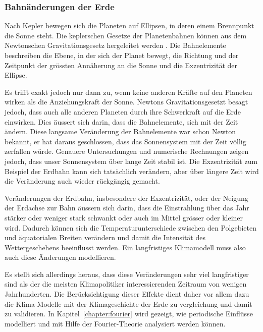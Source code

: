 \subsubsection{Bahnänderungen der Erde}
%
Nach Kepler bewegen sich die Planeten auf Ellipsen,
in deren einem Brennpunkt die Sonne steht.
Die keplerschen Gesetze der Planetenbahnen können aus dem Newtonschen 
Gravitationsgesetz hergeleitet werden
\cite[\S 6]{skript:joos}.
%
Die Bahnelemente beschreiben die Ebene, in der sich der Planet bewegt,
die Richtung und der Zeitpunkt der grössten Annäherung an die Sonne und
die Exzentrizität der Ellipse.
%

Es trifft exakt jedoch nur dann zu, wenn keine anderen Kräfte auf den
Planeten wirken als die Anziehungskraft der Sonne.
Newtons Gravitationsgesetzt besagt jedoch, dass auch alle anderen
Planeten durch ihre Schwerkraft auf die Erde einwirken.
Dies äussert sich darin, dass die Bahnelemente, sich mit der Zeit
ändern.
Diese langsame Veränderung der Bahnelemente war schon Newton bekannt,
er hat daraus geschlossen, dass das Sonnensystem mit der Zeit völlig
zerfallen würde.
Genauere Untersuchungen und numerische Rechnungen zeigen jedoch, dass
unser Sonnensystem über lange Zeit stabil ist.
Die Exzentrizität zum Beispiel der Erdbahn kann sich tatsächlich verändern,
aber über längere Zeit wird die Veränderung auch wieder rückgängig
gemacht.

Veränderungen der Erdbahn, insbesondere der Exzentrizität, oder der
Neigung der Erdachse zur Bahn äussern sich darin, dass die Einstrahlung
über das Jahr stärker oder weniger stark schwankt oder auch im Mittel
grösser oder kleiner wird.
%
Dadurch können sich die Temperaturunterschiede zwischen den Polgebieten und
äquatorialen Breiten verändern und damit die Intensität des Wettergeschehens
beeinflusst werden.
Ein langfristiges Klimamodell muss also auch diese Änderungen
modellieren.

Es stellt sich allerdings heraus, dass diese Veränderungen sehr viel
langfristiger sind als der die meisten Klimapolitiker interessierenden
Zeitraum von wenigen Jahrhunderten.
Die Berücksichtigung dieser Effekte dient daher vor allem dazu die
Klima-Modelle mit der Klimageschichte der Erde zu vergleichung und
damit zu validieren.
In Kapitel~\ref{chapter:fourier} wird gezeigt, wie periodische Einflüsse
modelliert und mit Hilfe der Fourier-Theorie analysiert werden können.

